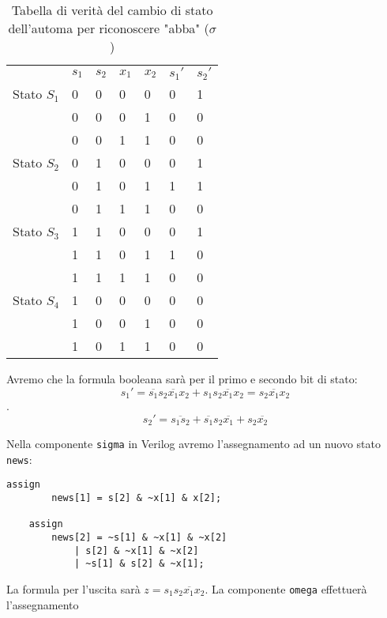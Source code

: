 \begin{exrc}
	\begin{table}[H]
		\centering
		\caption{Tabella di verità del cambio di stato dell'automa per riconoscere "abba" ($\sigma$)}
		\label{tab:mealysigma2}
		\begin{tabular}{l|llll|ll|}
			\cline{2-7}
			& $s_1$ & $s_2$ & $x_1$ & $x_2$ & $s_1'$ & $s_2'$ \\ \cline{2-7}
			Stato $S_1$ & 0     & 0     & 0     & 0     & 0      & 1      \\
			& 0     & 0     & 0     & 1     & 0      & 0      \\
			& 0     & 0     & 1     & 1     & 0      & 0      \\ \cline{2-7}
			Stato $S_2$ & 0     & 1     & 0     & 0     & 0      & 1      \\
			& 0     & 1     & 0     & 1     & 1      & 1      \\
			& 0     & 1     & 1     & 1     & 0      & 0      \\ \cline{2-7}
			Stato $S_3$ & 1     & 1     & 0     & 0     & 0      & 1      \\
			& 1     & 1     & 0     & 1     & 1      & 0      \\
			& 1     & 1     & 1     & 1     & 0      & 0      \\ \cline{2-7}
			Stato $S_4$ & 1     & 0     & 0     & 0     & 0      & 0      \\
			& 1     & 0     & 0     & 1     & 0      & 0      \\
			& 1     & 0     & 1     & 1     & 0      & 0      \\ \cline{2-7}
		\end{tabular}
	\end{table}

	Avremo che la formula booleana sarà per il primo e secondo bit di stato:
	\[ s_1' = \overbar{s_1}s_2\overbar{x_1}x_2 + s_1s_2\overbar{x_1}x_2 =
	s_2\overbar{x_1}x_2 \].
	\[ s_2' = \overbar{s_1s_2}+ \overbar{s_1}s_2\overbar{x_1} +
	s_2\overbar{x_2}\]
	
	Nella componente \texttt{sigma} in Verilog avremo l'assegnamento ad un nuovo
	stato \texttt{news}:
	
	\begin{lstlisting}[style={verilog}]
	assign
		news[1] = s[2] & ~x[1] & x[2];
	
	assign
		news[2] = ~s[1] & ~x[1] & ~x[2]
			| s[2] & ~x[1] & ~x[2]
			| ~s[1] & s[2] & ~x[1];
	\end{lstlisting}

	La formula per l'uscita sarà $ z = s_1\overbar{s_2x_1x_2} $. La componente
	\texttt{omega} effettuerà l'assegnamento


\end{exrc}
